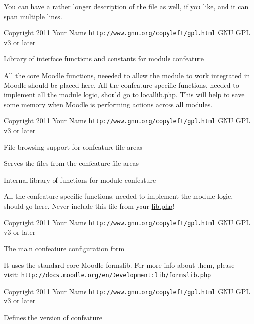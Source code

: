 You can have a rather longer description of the file as well, if you like, and it can span multiple lines.

\begin{DoxyCopyright}{Copyright}
2011 Your Name  \href{http://www.gnu.org/copyleft/gpl.html}{\tt http\-://www.\-gnu.\-org/copyleft/gpl.\-html} G\-N\-U G\-P\-L v3 or later
\end{DoxyCopyright}
Library of interface functions and constants for module confeature

All the core Moodle functions, neeeded to allow the module to work integrated in Moodle should be placed here. All the confeature specific functions, needed to implement all the module logic, should go to \hyperlink{locallib_8php}{locallib.\-php}. This will help to save some memory when Moodle is performing actions across all modules.

\begin{DoxyCopyright}{Copyright}
2011 Your Name  \href{http://www.gnu.org/copyleft/gpl.html}{\tt http\-://www.\-gnu.\-org/copyleft/gpl.\-html} G\-N\-U G\-P\-L v3 or later
\end{DoxyCopyright}
File browsing support for confeature file areas

Serves the files from the confeature file areas

Internal library of functions for module confeature

All the confeature specific functions, needed to implement the module logic, should go here. Never include this file from your \hyperlink{lib_8php}{lib.\-php}!

\begin{DoxyCopyright}{Copyright}
2011 Your Name  \href{http://www.gnu.org/copyleft/gpl.html}{\tt http\-://www.\-gnu.\-org/copyleft/gpl.\-html} G\-N\-U G\-P\-L v3 or later
\end{DoxyCopyright}
The main confeature configuration form

It uses the standard core Moodle formslib. For more info about them, please visit\-: \href{http://docs.moodle.org/en/Development:lib/formslib.php}{\tt http\-://docs.\-moodle.\-org/en/\-Development\-:lib/formslib.\-php}

\begin{DoxyCopyright}{Copyright}
2011 Your Name  \href{http://www.gnu.org/copyleft/gpl.html}{\tt http\-://www.\-gnu.\-org/copyleft/gpl.\-html} G\-N\-U G\-P\-L v3 or later
\end{DoxyCopyright}
Defines the version of confeature

